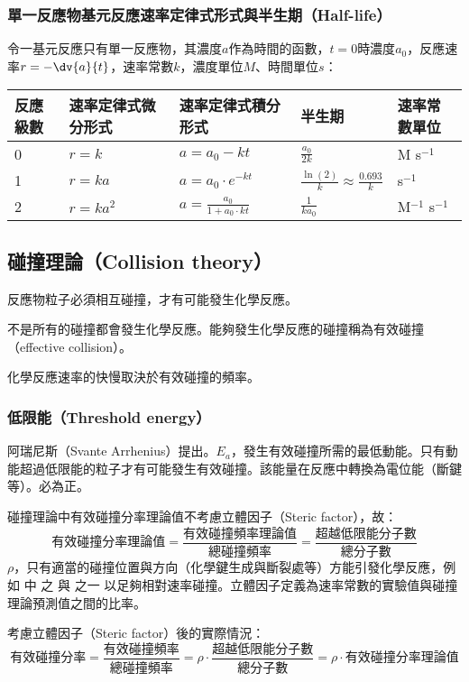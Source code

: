 \documentclass[a4paper,12pt]{report}
\begin{document}
\subsubsection{單一反應物基元反應速率定律式形式與半生期（Half-life）}
令一基元反應只有單一反應物，其濃度$a$作為時間的函數，$t=0$時濃度$a_0$，反應速率$r=-\dv{a}{t}$，速率常數$k$，濃度單位$M$、時間單位$s$：
\begin{longtable}[c]{|p{}|p{}|p{}|p{}|p{}|}
\hline
反應級數 & 速率定律式微分形式 & 速率定律式積分形式 & 半生期 & 速率常數單位 \\\hline
0 & $r=k$ & $a=a_0-kt$ & $\frac{a_0}{2k}$ & M s$^{-1}$ \\\hline
1 & $r=ka$ & $a=a_0\cdot e^{-kt}$ & $\frac{\ln(2)}{k}\approx\frac{0.693}{k}$ & s$^{-1}$ \\\hline
2 & $r=ka^2$ & $a=\frac{a_0}{1+a_0\cdot kt}$ & $\frac{1}{ka_0}$ & M$^{-1}$ s$^{-1}$ \\\hline
\end{longtable}\FloatBarrier
\subsection{碰撞理論（Collision theory）}
\ben
\item 反應物粒子必須相互碰撞，才有可能發生化學反應。
\item 不是所有的碰撞都會發生化學反應。能夠發生化學反應的碰撞稱為有效碰撞（effective collision）。
\item 化學反應速率的快慢取決於有效碰撞的頻率。
\een
\subsubsection{低限能（Threshold energy）}
阿瑞尼斯（Svante Arrhenius）提出。$E_a$，發生有效碰撞所需的最低動能。只有動能超過低限能的粒子才有可能發生有效碰撞。該能量在反應中轉換為電位能（斷鍵等）。必為正。

碰撞理論中有效碰撞分率理論值不考慮立體因子（Steric factor），故：
\[\text{有效碰撞分率理論值}=\frac{\text{有效碰撞頻率理論值}}{\text{總碰撞頻率}}=\frac{\text{超越低限能分子數}}{\text{總分子數}}\]
$\rho$，只有適當的碰撞位置與方向（化學鍵生成與斷裂處等）方能引發化學反應，例如  中  之  與  之一  以足夠相對速率碰撞。立體因子定義為速率常數的實驗值與碰撞理論預測值之間的比率。

考慮立體因子（Steric factor）後的實際情況：
\[\text{有效碰撞分率}=\frac{\text{有效碰撞頻率}}{\text{總碰撞頻率}}=\rho\cdot\frac{\text{超越低限能分子數}}{\text{總分子數}}=\rho\cdot\text{有效碰撞分率理論值}\]
\end{document}
